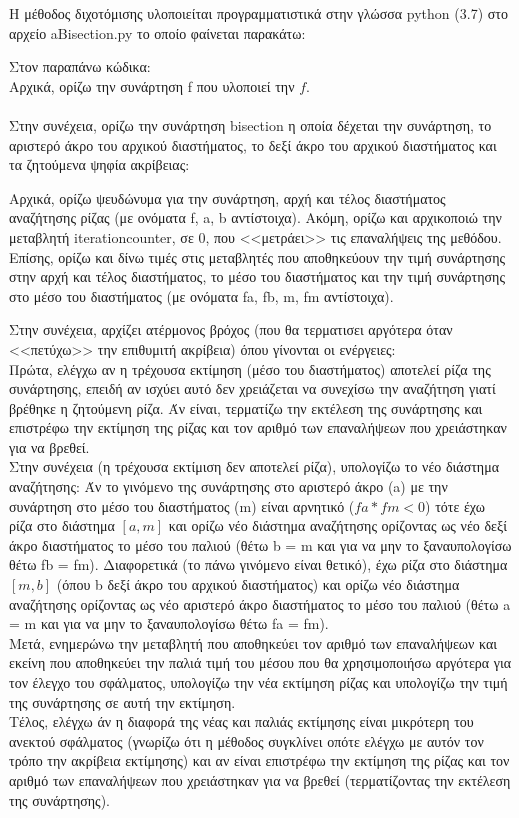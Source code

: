 \documentclass[a4paper,11pt]{article}
\newcommand{\lt}{\latintext}
\newcommand{\gt}{\greektext}
\begin{document}
\gt Η μέθοδος διχοτόμισης υλοποιείται προγραμματιστικά στην γλώσσα {\lt python} (3.7) στο αρχείο {\lt a\textunderscore Bisection.py} το οποίο φαίνεται παρακάτω:

\lt

\gt

Στον παραπάνω κώδικα:
\\
Αρχικά, ορίζω την συνάρτηση {\lt f} που υλοποιεί την $f$.\\
\\
Στην συνέχεια, ορίζω την συνάρτηση {\lt bisection} η οποία δέχεται την συνάρτηση, το αριστερό άκρο του αρχικού διαστήματος, το δεξί άκρο του αρχικού διαστήματος και τα ζητούμενα ψηφία ακρίβειας:\par
Αρχικά, ορίζω ψευδώνυμα για την συνάρτηση, αρχή και τέλος διαστήματος αναζήτησης ρίζας (με ονόματα {\lt f, a, b} αντίστοιχα).
Ακόμη, ορίζω και αρχικοποιώ την μεταβλητή {\lt iteration\textunderscore counter}, σε 0,  που <<μετράει>> τις επαναλήψεις της μεθόδου.
Επίσης, ορίζω και δίνω τιμές στις μεταβλητές που αποθηκεύουν την τιμή συνάρτησης στην αρχή και τέλος διαστήματος, το μέσο του διαστήματος και την τιμή συνάρτησης στο μέσο του διαστήματος (με ονόματα {\lt fa, fb, m, fm} αντίστοιχα). 

Στην συνέχεια, αρχίζει ατέρμονος βρόχος (που θα τερματισει αργότερα όταν <<πετύχω>> την επιθυμιτή ακρίβεια) όπου γίνονται οι ενέργειες:\\
Πρώτα, ελέγχω αν η τρέχουσα εκτίμηση (μέσο του διαστήματος) αποτελεί ρίζα της συνάρτησης, επειδή αν ισχύει αυτό δεν χρειάζεται να συνεχίσω την αναζήτηση γιατί βρέθηκε η ζητούμενη ρίζα. Άν είναι, τερματίζω την εκτέλεση της συνάρτησης και επιστρέφω την εκτίμηση της ρίζας και τον αριθμό των επαναλήψεων που χρειάστηκαν για να βρεθεί.\\
Στην συνέχεια (η τρέχουσα εκτίμιση δεν αποτελεί ρίζα), υπολογίζω το νέο διάστημα αναζήτησης: Άν το γινόμενο της συνάρτησης στο αριστερό άκρο ({\lt a}) με την συνάρτηση στο μέσο του διαστήματος ({\lt m}) είναι αρνητικό ({\lt $fa * fm < 0$}) τότε έχω ρίζα στο διάστημα $[a, m]$ και ορίζω νέο διάστημα αναζήτησης ορίζοντας ως νέο δεξί άκρο διαστήματος το μέσο του παλιού (θέτω {\lt b = m} και για να μην το ξαναυπολογίσω θέτω {\lt fb = fm}). Διαφορετικά (το πάνω γινόμενο είναι θετικό), έχω ρίζα στο διάστημα {\lt $[m, b]$} (όπου {\lt b} δεξί άκρο του αρχικού διαστήματος) και ορίζω νέο διάστημα αναζήτησης ορίζοντας ως νέο αριστερό άκρο διαστήματος το μέσο του παλιού (θέτω {\lt a = m} και για να μην το ξαναυπολογίσω θέτω {\lt fa = fm}).\\
Μετά, ενημερώνω την μεταβλητή που αποθηκεύει τον αριθμό των επαναλήψεων και εκείνη που αποθηκεύει την παλιά τιμή του μέσου που θα χρησιμοποιήσω αργότερα για τον έλεγχο του σφάλματος, υπολογίζω την νέα εκτίμηση ρίζας και υπολογίζω την τιμή της συνάρτησης σε αυτή την εκτίμηση.\\
Τέλος, ελέγχω άν η διαφορά της νέας και παλιάς εκτίμησης είναι μικρότερη του ανεκτού σφάλματος (γνωρίζω ότι η μέθοδος συγκλίνει οπότε ελέγχω με αυτόν τον τρόπο την ακρίβεια εκτίμησης) και αν είναι επιστρέφω την εκτίμηση της ρίζας και τον αριθμό των επαναλήψεων που χρειάστηκαν για να βρεθεί (τερματίζοντας την εκτέλεση της συνάρτησης).
\end{document}
